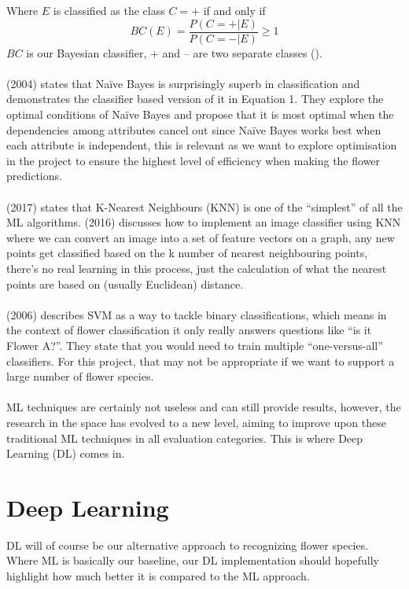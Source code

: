 \documentclass{article}
\begin{document}
Where \(E\) is classified as the class \(C = +\) if and only if
\[BC(E) = \frac{P(C = +|E)}{P(C = -|E)} \geq 1\]
\(BC\) is our Bayesian classifier, + and – are two separate classes (\cite{zhang2004optimality}).
\\
\\
\citeauthor{zhang2004optimality} (2004) states that Naïve Bayes is surprisingly superb in classification and 
demonstrates the classifier based version of it in Equation 1. They explore the optimal conditions of Naïve Bayes and propose
 that it is most optimal when the dependencies among attributes cancel out since Naïve Bayes works best when each 
 attribute is independent, this is relevant as we want to explore optimisation in the project to ensure the highest 
 level of efficiency when making the flower predictions.
 \\
 \\
 \citeauthor{MohammedMohssen2017Ml:a} (2017) states that K-Nearest Neighbours (KNN) is one of the “simplest” of  all the ML algorithms. 
 \citeauthor{rosebook2016} (2016) discusses how to implement an image classifier using KNN where we can convert an image into a set 
 of feature vectors on a graph, any new points get classified based on the k number of nearest neighbouring points, 
 there’s no real learning in this process, just the calculation of what the nearest points are based on 
 (usually Euclidean) distance.
 \\
 \\
 \citeauthor{NobleWilliamS2006Wias} (2006) describes SVM as a way to tackle binary classifications, which means in the context of flower 
 classification it only really answers questions like “is it Flower A?”. They state that you would need to train 
 multiple “one-versus-all” classifiers. For this project, that may not be appropriate if we want to support a large 
 number of flower species.
 \\
 \\
 ML techniques are certainly not useless and can still provide results, however, the research in the space has evolved 
 to a new level, aiming to improve upon these traditional ML techniques in all evaluation categories. This is where Deep
  Learning (DL) comes in.
\section{Deep Learning}
DL will of course be our alternative approach to recognizing flower species. Where ML is basically our baseline, our DL 
implementation should hopefully highlight how much better it is compared to the ML approach.
\end{document}

